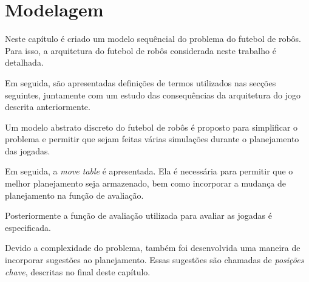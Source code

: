\chapter{Modelagem}\label{cap:modelagem}

Neste capítulo é criado um modelo sequêncial do problema do futebol
de robôs. Para isso, a arquitetura do futebol de robôs considerada
neste trabalho é detalhada. 

Em seguida, são apresentadas definições de termos utilizados nas
secções seguintes, juntamente com um estudo das consequências da
arquitetura do jogo descrita anteriormente.

Um modelo abstrato discreto do futebol de robôs é proposto para simplificar
o problema e permitir que sejam feitas várias simulações durante o
planejamento das jogadas. 

Em seguida, a \textit{move table} é apresentada. Ela é necessária para
permitir que o melhor planejamento seja armazenado, bem como incorporar
a mudança de planejamento na função de avaliação.

Posteriormente a função de avaliação utilizada para avaliar as jogadas
é especificada.

Devido a complexidade do problema, também foi desenvolvida uma maneira de
incorporar sugestões ao planejamento. Essas sugestões são chamadas de
\textit{posições chave}, descritas no final deste capítulo.







